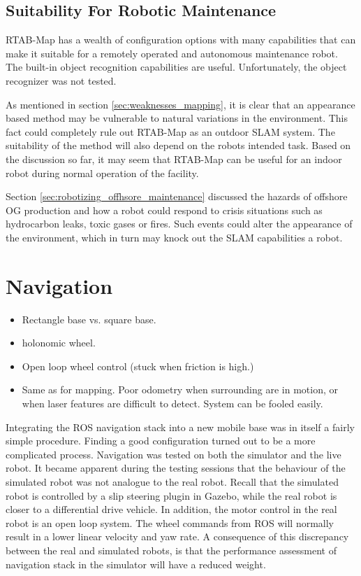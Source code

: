\subsection{Suitability For Robotic Maintenance}

\ac{RTAB-Map} has a wealth of configuration options with many capabilities that can make it suitable for a remotely operated and autonomous maintenance robot. The built-in object recognition capabilities are useful. Unfortunately, the object recognizer was not tested. 

As mentioned in section \ref{sec:weaknesses_mapping}, it is clear that an appearance based method may be vulnerable to natural variations in the environment. This fact could completely rule out \ac{RTAB-Map} as an outdoor \ac{SLAM} system. The suitability of the method will also depend on the robots intended task. Based on the discussion so far, it may seem that \ac{RTAB-Map} can be useful for an indoor robot during normal operation of the facility. 

Section \ref{sec:robotizing_offhsore_maintenance} discussed the hazards of offshore \ac{OG} production and how a robot could respond to crisis situations such as hydrocarbon leaks, toxic gases or fires. Such events could alter the appearance of the environment, which in turn may knock out the \ac{SLAM} capabilities a robot.

\section{Navigation}
\begin{itemize}
\item Rectangle base vs. square base.
\item holonomic wheel.
\item Open loop wheel control (stuck when friction is high.)
\item Same as for mapping. Poor odometry when surrounding are in motion, or when laser features are difficult to detect. System can be fooled easily. 
\end{itemize}

Integrating the \ac{ROS} navigation stack into a new mobile base was in itself a fairly simple procedure. Finding a good configuration turned out to be a more complicated process. Navigation was tested on both the simulator and the live robot. It became apparent during the testing sessions that the behaviour of the simulated robot was not analogue to the real robot. Recall that the simulated robot is controlled by a slip steering plugin in Gazebo, while the real robot is closer to a differential drive vehicle. In addition, the motor control in the real robot is an open loop system. The wheel commands from \ac{ROS} will normally result in a lower linear velocity and yaw rate. A consequence of this discrepancy between the real and simulated robots, is that the performance assessment of navigation stack in the simulator will have a reduced weight.

